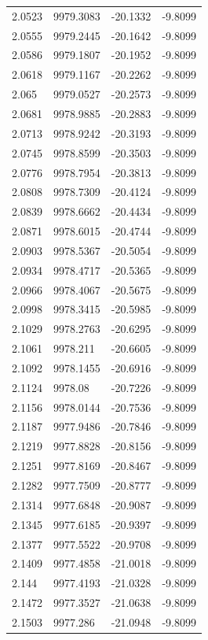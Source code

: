 \begin{table}[H]
\begin{tabular}{llll}
2.0523 & 9979.3083 & -20.1332 & -9.8099 \\
2.0555 & 9979.2445 & -20.1642 & -9.8099 \\
2.0586 & 9979.1807 & -20.1952 & -9.8099 \\
2.0618 & 9979.1167 & -20.2262 & -9.8099 \\
2.065 & 9979.0527 & -20.2573 & -9.8099 \\
2.0681 & 9978.9885 & -20.2883 & -9.8099 \\
2.0713 & 9978.9242 & -20.3193 & -9.8099 \\
2.0745 & 9978.8599 & -20.3503 & -9.8099 \\
2.0776 & 9978.7954 & -20.3813 & -9.8099 \\
2.0808 & 9978.7309 & -20.4124 & -9.8099 \\
2.0839 & 9978.6662 & -20.4434 & -9.8099 \\
2.0871 & 9978.6015 & -20.4744 & -9.8099 \\
2.0903 & 9978.5367 & -20.5054 & -9.8099 \\
2.0934 & 9978.4717 & -20.5365 & -9.8099 \\
2.0966 & 9978.4067 & -20.5675 & -9.8099 \\
2.0998 & 9978.3415 & -20.5985 & -9.8099 \\
2.1029 & 9978.2763 & -20.6295 & -9.8099 \\
2.1061 & 9978.211 & -20.6605 & -9.8099 \\
2.1092 & 9978.1455 & -20.6916 & -9.8099 \\
2.1124 & 9978.08 & -20.7226 & -9.8099 \\
2.1156 & 9978.0144 & -20.7536 & -9.8099 \\
2.1187 & 9977.9486 & -20.7846 & -9.8099 \\
2.1219 & 9977.8828 & -20.8156 & -9.8099 \\
2.1251 & 9977.8169 & -20.8467 & -9.8099 \\
2.1282 & 9977.7509 & -20.8777 & -9.8099 \\
2.1314 & 9977.6848 & -20.9087 & -9.8099 \\
2.1345 & 9977.6185 & -20.9397 & -9.8099 \\
2.1377 & 9977.5522 & -20.9708 & -9.8099 \\
2.1409 & 9977.4858 & -21.0018 & -9.8099 \\
2.144 & 9977.4193 & -21.0328 & -9.8099 \\
2.1472 & 9977.3527 & -21.0638 & -9.8099 \\
2.1503 & 9977.286 & -21.0948 & -9.8099 \\

\end{tabular}
\end{table}
